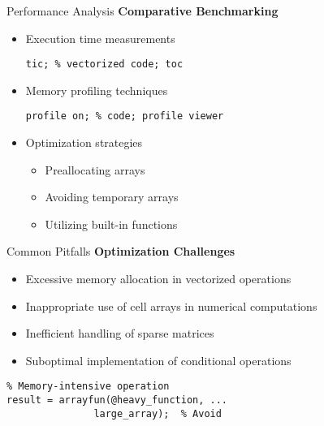 \documentclass[10pt]{beamer}
\theoremstyle{plain}%
\theoremstyle{definition}
\theoremstyle{remark}
\begin{document}
\begin{frame}[fragile]{Performance Analysis}
  \textbf{Comparative Benchmarking}
  \begin{itemize}
      \item Execution time measurements
      \begin{lstlisting}
tic; % vectorized code; toc
      \end{lstlisting}
      \item Memory profiling techniques
      \begin{lstlisting}
profile on; % code; profile viewer
      \end{lstlisting}
      \item Optimization strategies
      \begin{itemize}
          \item Preallocating arrays
          \item Avoiding temporary arrays
          \item Utilizing built-in functions
      \end{itemize}
  \end{itemize}
\end{frame}

\begin{frame}[fragile]{Common Pitfalls}
  \textbf{Optimization Challenges}
  \begin{itemize}
      \item Excessive memory allocation in vectorized operations
      \item Inappropriate use of cell arrays in numerical computations
      \item Inefficient handling of sparse matrices
      \item Suboptimal implementation of conditional operations
  \end{itemize}
  \begin{lstlisting}
% Memory-intensive operation
result = arrayfun(@heavy_function, ...
               large_array);  % Avoid
  \end{lstlisting}
\end{frame}
\end{document}

